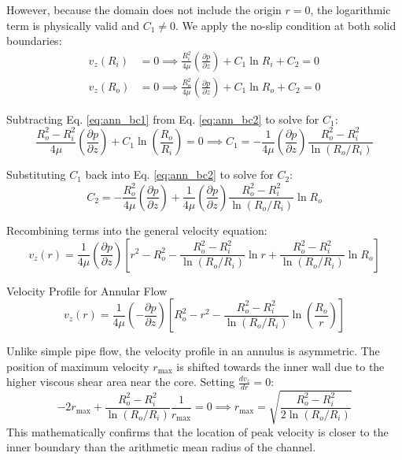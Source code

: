 However, because the domain does not include the origin $r=0$, the logarithmic term is physically valid and $C_1 \neq 0$. We apply the no-slip condition at both solid boundaries:
\begin{align}
v_z(R_i) &= 0 \implies \frac{R_i^2}{4\mu} \left(\frac{\partial p}{\partial z}\right) + C_1 \ln R_i + C_2 = 0 \label{eq:ann_bc1} \\
v_z(R_o) &= 0 \implies \frac{R_o^2}{4\mu} \left(\frac{\partial p}{\partial z}\right) + C_1 \ln R_o + C_2 = 0 \label{eq:ann_bc2}
\end{align}

Subtracting Eq. \eqref{eq:ann_bc1} from Eq. \eqref{eq:ann_bc2} to solve for $C_1$:
\begin{equation}
\frac{R_o^2 - R_i^2}{4\mu} \left(\frac{\partial p}{\partial z}\right) + C_1 \ln\left(\frac{R_o}{R_i}\right) = 0 \implies C_1 = -\frac{1}{4\mu} \left(\frac{\partial p}{\partial z}\right) \frac{R_o^2 - R_i^2}{\ln(R_o/R_i)}
\end{equation}

Substituting $C_1$ back into Eq. \eqref{eq:ann_bc2} to solve for $C_2$:
\begin{equation}
C_2 = -\frac{R_o^2}{4\mu} \left(\frac{\partial p}{\partial z}\right) + \frac{1}{4\mu} \left(\frac{\partial p}{\partial z}\right) \frac{R_o^2 - R_i^2}{\ln(R_o/R_i)} \ln R_o
\end{equation}

Recombining terms into the general velocity equation:
\begin{equation}
v_z(r) = \frac{1}{4\mu} \left(\frac{\partial p}{\partial z}\right) \left[ r^2 - R_o^2 - \frac{R_o^2 - R_i^2}{\ln(R_o/R_i)} \ln r + \frac{R_o^2 - R_i^2}{\ln(R_o/R_i)} \ln R_o \right]
\end{equation}

\begin{eqbox}{Velocity Profile for Annular Flow}
\begin{equation}
v_z(r) = \frac{1}{4\mu} \left(-\frac{\partial p}{\partial z}\right) \left[ R_o^2 - r^2 - \frac{R_o^2 - R_i^2}{\ln(R_o/R_i)} \ln\left(\frac{R_o}{r}\right) \right]
\end{equation}
\end{eqbox}

\begin{expertbox}
Unlike simple pipe flow, the velocity profile in an annulus is asymmetric. The position of maximum velocity $r_{\text{max}}$ is shifted towards the inner wall due to the higher viscous shear area near the core. Setting $\frac{d v_z}{dr} = 0$:
\begin{equation}
-2r_{\text{max}} + \frac{R_o^2 - R_i^2}{\ln(R_o/R_i)} \frac{1}{r_{\text{max}}} = 0 \implies r_{\text{max}} = \sqrt{\frac{R_o^2 - R_i^2}{2 \ln(R_o/R_i)}}
\end{equation}
This mathematically confirms that the location of peak velocity is closer to the inner boundary than the arithmetic mean radius of the channel.
\end{expertbox}